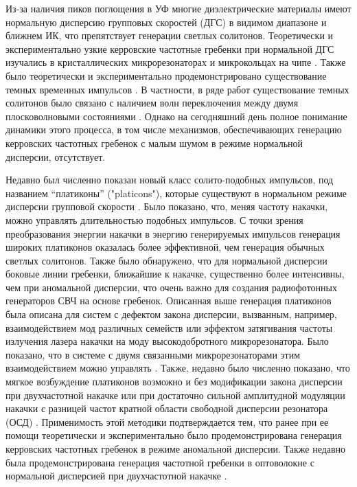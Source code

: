 Из-за наличия пиков поглощения в УФ многие диэлектрические материалы имеют нормальную дисперсию групповых скоростей (ДГС) в видимом диапазоне и ближнем ИК, что препятствует генерации светлых солитонов. Теоретически и экспериментально узкие керровские частотные гребенки при нормальной ДГС изучались в кристаллических микрорезонаторах \cite{Coillet2013,Liang2014,Henriet2015} и микрокольцах на чипе \cite{Huang2015prl}. Также было теоретически и экспериментально продемонстрировано существование темных временных импульсов \cite{Godey2014,Xue2015,Lobanov2015,ParraRivas2016}. В частности, в ряде работ существование темных солитонов было связано с наличием волн переключения между двумя плосковолновыми состояниями \cite{ParraRivas2016}. Однако на сегодняшний день полное понимание динамики этого процесса, в том числе механизмов, обеспечивающих генерацию керровских частотных гребенок с малым шумом в режиме нормальной дисперсии, отсутствует.


Недавно был численно показан новый класс солито-подобных импульсов, под названием “платиконы” ("platicons"), которые существуют в нормальном режиме дисперсии групповой скорости \cite{Lobanov2015}. Было показано, что, меняя частоту накачки, можно управлять длительностью подобных импульсов. С точки зрения преобразования энергии накачки в энергию генерируемых импульсов генерация широких платиконов оказалась более эффективной, чем генерация обычных светлых солитонов. Также было обнаружено, что для нормальной дисперсии боковые линии гребенки, ближайшие к накачке, существенно более интенсивны, чем при аномальной дисперсии, что очень важно для создания радиофотонных генераторов СВЧ на основе гребенок. Описанная выше генерация платиконов была описана для систем с дефектом закона дисперсии, вызванным, например, взаимодействием мод различных семейств \cite{HerrPRL2014,Liu2014} или эффектом затягивания частоты излучения лазера накачки на моду высокодобротного микрорезонатора. Было показано, что в системе с двумя связанными микрорезонаторами этим взаимодействием можно управлять \cite{Liu2015}. Также, недавно было численно показано, что мягкое возбуждение платиконов возможно и без модификации закона дисперсии при двухчастотной накачке или при достаточно сильной амплитудной модуляции накачки с разницей частот кратной области свободной дисперсии резонатора (ОСД) \cite{Lobanov2015epl}. Применимость этой методики подтверждается тем, что ранее при ее помощи теоретически \cite{Hansson2014} и экспериментально \cite{Strekalov2009} было продемонстрирована генерация керровских частотных гребенок в режиме аномальной дисперсии. Также недавно была продемонстрирована генерация частотной гребенки в оптоволокне с нормальной дисперсией при двухчастотной накачке \cite{Antikainen2015}.


